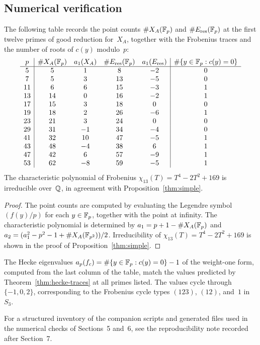 \subsection{Numerical verification}

\begin{proposition}\label{prop:verification}
The following table records the point counts \(\#X_A(\mathbb{F}_p)\) and \(\#E_{\mathrm{res}}(\mathbb{F}_p)\) at the first twelve primes of good reduction for~\(X_A\), together with the Frobenius traces and the number of roots of \(c(y)\) modulo~\(p\):
\[
\begin{array}{c|cccc|c}
p & \#X_A(\mathbb{F}_p) & a_1(X_A) & \#E_{\mathrm{res}}(\mathbb{F}_p) & a_1(E_{\mathrm{res}}) & \#\{y\in\mathbb{F}_p:c(y)=0\}\\ \hline
5 & 5 & 1 & 8 & -2 & 0 \\
7 & 5 & 3 & 13 & -5 & 0 \\
11 & 6 & 6 & 15 & -3 & 1 \\
13 & 14 & 0 & 16 & -2 & 1 \\
17 & 15 & 3 & 18 & 0 & 0 \\
19 & 18 & 2 & 26 & -6 & 1 \\
23 & 21 & 3 & 24 & 0 & 0 \\
29 & 31 & -1 & 34 & -4 & 0 \\
41 & 32 & 10 & 47 & -5 & 1 \\
43 & 48 & -4 & 38 & 6 & 1 \\
47 & 42 & 6 & 57 & -9 & 1 \\
53 & 62 & -8 & 59 & -5 & 1 \\
\end{array}
\]
The characteristic polynomial of Frobenius \(\chi_{13}(T)=T^4-2T^2+169\) is irreducible over~\(\mathbb{Q}\), in agreement with Proposition~\ref{thm:simple}.
\end{proposition}

\begin{proof}
The point counts are computed by evaluating the Legendre symbol \((f(y)/p)\) for each \(y\in\mathbb{F}_p\), together with the point at infinity. The characteristic polynomial is determined by \(a_1=p+1-\#X_A(\mathbb{F}_p)\) and \(a_2=(a_1^2-p^2-1+\#X_A(\mathbb{F}_{p^2}))/2\). Irreducibility of \(\chi_{13}(T)=T^4-2T^2+169\) is shown in the proof of Proposition~\ref{thm:simple}.
\end{proof}

\begin{remark}\label{rem:verification-hecke}
The Hecke eigenvalues \(a_p(f_c)=\#\{y\in\mathbb{F}_p:c(y)=0\}-1\) of the weight-one form, computed from the last column of the table, match the values predicted by Theorem~\ref{thm:hecke-traces} at all primes listed. The values cycle through \(\{-1,0,2\}\), corresponding to the Frobenius cycle types \((123)\), \((12)\), and~\(1\) in~\(S_3\).
\end{remark}

\begin{remark}\label{rem:reproducibility-scripts}
For a structured inventory of the companion scripts and generated files used in the numerical checks of Sections~5 and~6, see the reproducibility note recorded after Section~7.
\end{remark}
